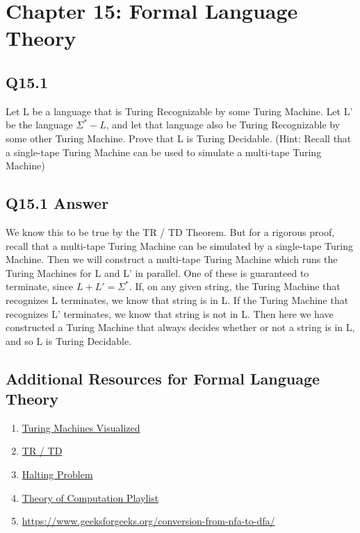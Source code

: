 \documentclass{article}
\begin{document}
\section*{Chapter 15: Formal Language Theory}

\subsection*{Q15.1}
Let L be a language that is Turing Recognizable by some Turing Machine. Let L' be the language $\Sigma^* - L$,
and let that language also be Turing Recognizable by some other Turing Machine. Prove that L is Turing Decidable.
(Hint: Recall that a single-tape Turing Machine can be used to simulate a multi-tape Turing Machine)
\newpage
\subsection*{Q15.1 Answer}
We know this to be true by the TR / TD Theorem. But for a rigorous proof, recall that a multi-tape Turing Machine can be simulated by
a single-tape Turing Machine. Then we will construct a multi-tape Turing Machine which runs the Turing Machines for L and L' in parallel. One of these
is guaranteed to terminate, since $L + L' = \Sigma^*$. If, on any given string, the Turing Machine that recognizes L terminates, 
we know that string is in L. If the Turing Machine that recognizes L' terminates, we know that string is not in L. Then here we have
constructed a Turing Machine that always decides whether or not a string is in L, and so L is Turing Decidable.
\newpage

\subsection*{Additional Resources for Formal Language Theory}
\begin{enumerate}
    \item \href{https://www.youtube.com/watch?v=-ZS_zFg4w5k}{Turing Machines Visualized}
    \item \href{https://www.youtube.com/watch?v=sNWC1Zz6qcg}{TR / TD}
    \item \href{https://www.youtube.com/watch?v=VyHbd6sx5Po}{Halting Problem}
    \item \href{https://www.youtube.com/watch?v=SV57Yv8BXBc&list=PLhqug0UEsC-IDomfNsn8e3neoy34o8oye}{Theory of Computation Playlist}
	\item \url{https://www.geeksforgeeks.org/conversion-from-nfa-to-dfa/}
\end{enumerate}
\end{document}
